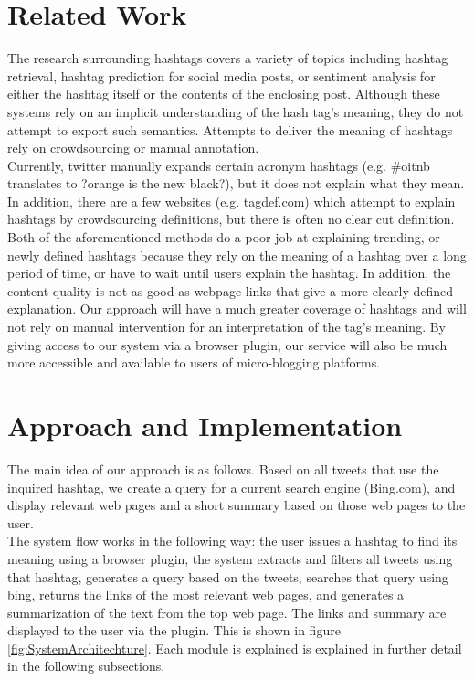 \documentclass{sig-alternate}
\begin{document}
\section{Related Work}
The research surrounding hashtags covers a variety of topics including hashtag retrieval\cite{efron:retrieval}, hashtag prediction\cite{khabiri:predict}\cite{tagspace} for social media posts, or sentiment analysis for either the hashtag itself or the contents of the enclosing post.  Although these systems rely on an implicit understanding of the hash tag's meaning, they do not attempt to export such semantics.  Attempts to deliver the meaning of hashtags rely on crowdsourcing or manual annotation.\\
Currently, twitter manually expands certain acronym hashtags (e.g. \#oitnb translates to ?orange is the new black?), but it does not explain what they mean. In addition, there are a few websites (e.g. tagdef.com) which attempt to explain hashtags by crowdsourcing definitions, but there is often no clear cut definition. Both of the aforementioned methods do a poor job at explaining trending, or newly defined hashtags because they rely on the meaning of a hashtag over a long period of time, or have to wait until users explain the hashtag. In addition, the content quality is not as good as webpage links that give a more clearly defined explanation.
Our approach will have a much greater coverage of hashtags and will not rely on manual intervention for an interpretation of the tag's meaning.  By giving access to our system via a browser plugin, our service will also be much more accessible and available to users of micro-blogging platforms.\\

\section{Approach and Implementation}

The main idea of our approach is as follows. Based on all tweets that use the inquired hashtag, we create a query for a current search engine (Bing.com), and display relevant web pages and a short summary based on those web pages to the user. \\
The system flow works in the following way: the user issues a hashtag to find its meaning using a browser plugin, the system extracts and filters all tweets using that hashtag, generates a query based on the tweets, searches that query using bing, returns the links of the most relevant web pages, and generates a summarization of the text from the top web page. The links and summary are displayed to the user via the plugin. This is shown in figure \ref{fig:SystemArchitechture}. Each module is explained is explained in further detail in the following subsections.
\end{document}
